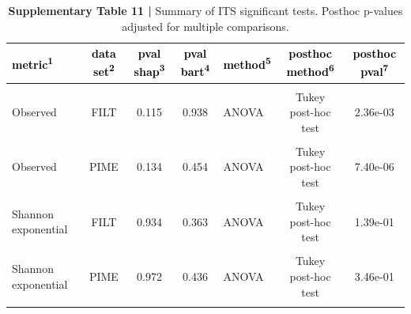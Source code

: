 \documentclass[
  10pt,
  letterpaper,
  DIV=11,
  numbers=noendperiod]{scrartcl}
\begin{document}
\begin{table}[H]

\caption{\textbf{Supplementary Table 11 |} Summary of ITS significant tests. Posthoc p-values adjusted for multiple comparisons.}
\centering
\fontsize{8}{10}\selectfont
\begin{threeparttable}
\begin{tabular}[t]{lccclcc}
\toprule
\textcolor{black}{\textbf{metric\textsuperscript{1}}} & \textcolor{black}{\textbf{data set\textsuperscript{2}}} & \textcolor{black}{\textbf{pval shap\textsuperscript{3}}} & \textcolor{black}{\textbf{pval bart\textsuperscript{4}}} & \textcolor{black}{\textbf{method\textsuperscript{5}}} & \textcolor{black}{\textbf{posthoc method\textsuperscript{6}}} & \textcolor{black}{\textbf{posthoc pval\textsuperscript{7}}}\\
\midrule
\cellcolor{gray!6}{Observed} & \cellcolor{gray!6}{FULL} & \cellcolor{gray!6}{0.128} & \cellcolor{gray!6}{0.516} & \cellcolor{gray!6}{ANOVA} & \cellcolor{gray!6}{Tukey post-hoc test} & \cellcolor{gray!6}{6.14e-03}\\
Observed & FILT & 0.115 & 0.938 & ANOVA & Tukey post-hoc test & 2.36e-03\\
\cellcolor{gray!6}{Observed} & \cellcolor{gray!6}{PERFect} & \cellcolor{gray!6}{0.162} & \cellcolor{gray!6}{0.667} & \cellcolor{gray!6}{ANOVA} & \cellcolor{gray!6}{Tukey post-hoc test} & \cellcolor{gray!6}{1.09e-03}\\
Observed & PIME & 0.134 & 0.454 & ANOVA & Tukey post-hoc test & 7.40e-06\\
\addlinespace
\cellcolor{gray!6}{Shannon exponential} & \cellcolor{gray!6}{FULL} & \cellcolor{gray!6}{0.846} & \cellcolor{gray!6}{0.445} & \cellcolor{gray!6}{ANOVA} & \cellcolor{gray!6}{Tukey post-hoc test} & \cellcolor{gray!6}{2.21e-01}\\
Shannon exponential & FILT & 0.934 & 0.363 & ANOVA & Tukey post-hoc test & 1.39e-01\\
\cellcolor{gray!6}{Shannon exponential} & \cellcolor{gray!6}{PERFect} & \cellcolor{gray!6}{0.919} & \cellcolor{gray!6}{0.555} & \cellcolor{gray!6}{ANOVA} & \cellcolor{gray!6}{Tukey post-hoc test} & \cellcolor{gray!6}{1.87e-01}\\
Shannon exponential & PIME & 0.972 & 0.436 & ANOVA & Tukey post-hoc test & 3.46e-01\\
\addlinespace
\cellcolor{gray!6}{Inverse Simpson} & \cellcolor{gray!6}{FULL} & \cellcolor{gray!6}{0.184} & \cellcolor{gray!6}{0.126} & \cellcolor{gray!6}{ANOVA} & \cellcolor{gray!6}{Tukey post-hoc test} & \cellcolor{gray!6}{1.82e-01}\\

\end{tabular}
\end{threeparttable}
\end{table}
\end{document}
